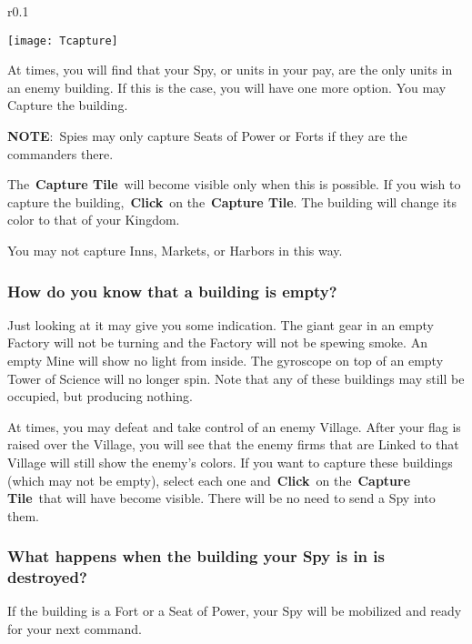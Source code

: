 \begin{wrapfigure}{r}{0.1\textwidth}
	\vspace{-20pt}
	\begin{center}
		\texttt{[image: Tcapture]}
	\end{center}
	\vspace{-20pt}
\end{wrapfigure}

At times, you will find that your Spy, or units in your pay, are the only units in an enemy building. If this is the case, you will have one more option. You may Capture the building.

\textbf{NOTE}: Spies may only capture Seats of Power or Forts if they are the commanders there.

The \textbf{Capture Tile} will become visible only when this is possible. If you wish to capture the building, \textbf{Click} on the \textbf{Capture Tile}. The building will change its color to that of your Kingdom.

You may not capture Inns, Markets, or Harbors in this way.

\subsubsection{How do you know that a building is empty?}

Just looking at it may give you some indication. The giant gear in an empty Factory will not be turning and the Factory will not be spewing smoke. An empty Mine will show no light from inside. The gyroscope on top of an empty Tower of Science will no longer spin. Note that any of these buildings may still be occupied, but producing nothing.

At times, you may defeat and take control of an enemy Village. After your flag is raised over the Village, you will see that the enemy firms that are Linked to that Village will still show the enemy’s colors. If you want to capture these buildings (which may not be empty), select each one and \textbf{Click} on the \textbf{Capture Tile} that will have become visible. There will be no need to send a Spy into them.

\subsubsection{What happens when the building your Spy is in is destroyed?}

If the building is a Fort or a Seat of Power, your Spy will be mobilized and ready for your next command.

